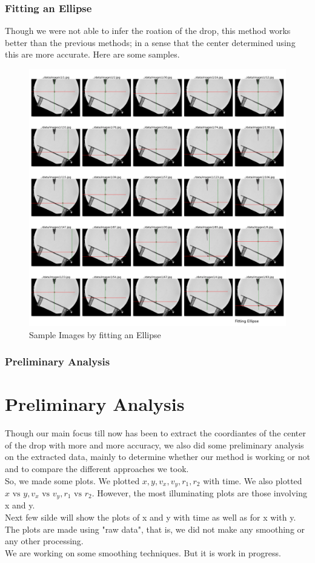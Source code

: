 \documentclass{beamer}
\begin{document}
\begin{frame}
    \frametitle{Fitting an Ellipse}
    \small
    Though we were not able to infer the roation of the drop, this method works better than the previous methods; in a sense that the center determined using this are more accurate. Here are some samples.
    \begin{figure}
        \centering
        \includegraphics[scale=0.07]{using_ap.png}
        \caption[]{Sample Images by fitting an Ellipse}
    \end{figure}
\end{frame}
\begin{frame}
    \frametitle{Preliminary Analysis}
    \section{Preliminary Analysis}
    Though our main focus till now has been to extract the coordiantes of the center of the drop with more and more accuracy, we also did some preliminary analysis on the extracted data, mainly to determine whether our method is working or not and to compare the different approaches we took.\\
    So, we made some plots. We plotted \(x, y, v_x, v_y, r_1, r_2\) with time. We also plotted \(x \text{ vs } y, v_x \text{ vs } v_y, r_1 \text{ vs } r_2\). However, the most illuminating plots are those involving x and y.\\
    Next few silde will show the plots of x and y with time as well as for x with y. The plots are made using "raw data", that is, we did not make any smoothing or any other processing.\\
    We are working on some smoothing techniques. But it is work in progress.
\end{frame}
\end{document}
